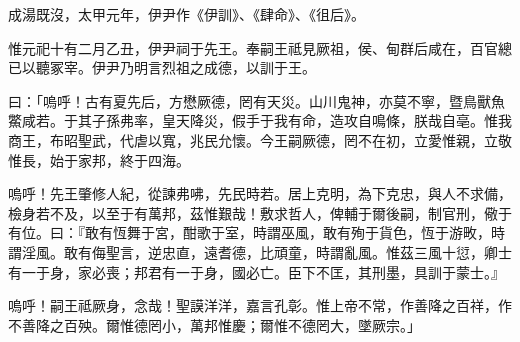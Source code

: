 
\begin{pinyinscope}
成湯既沒，太甲元年，伊尹作《伊訓》、《肆命》、《徂后》。

惟元祀十有二月乙丑，伊尹祠于先王。奉嗣王祗見厥祖，侯、甸群后咸在，百官總已以聽冢宰。伊尹乃明言烈祖之成德，以訓于王。

曰：「嗚呼！古有夏先后，方懋厥德，罔有天災。山川鬼神，亦莫不寧，暨鳥獸魚鱉咸若。于其子孫弗率，皇天降災，假手于我有命，造攻自鳴條，朕哉自亳。惟我商王，布昭聖武，代虐以寬，兆民允懷。今王嗣厥德，罔不在初，立愛惟親，立敬惟長，始于家邦，終于四海。

嗚呼！先王肇修人紀，從諫弗咈，先民時若。居上克明，為下克忠，與人不求備，檢身若不及，以至于有萬邦，茲惟艱哉！敷求哲人，俾輔于爾後嗣，制官刑，儆于有位。曰：『敢有恆舞于宮，酣歌于室，時謂巫風，敢有殉于貨色，恆于游畋，時謂淫風。敢有侮聖言，逆忠直，遠耆德，比頑童，時謂亂風。惟茲三風十愆，卿士有一于身，家必喪；邦君有一于身，國必亡。臣下不匡，其刑墨，具訓于蒙士。』

嗚呼！嗣王祗厥身，念哉！聖謨洋洋，嘉言孔彰。惟上帝不常，作善降之百祥，作不善降之百殃。爾惟德罔小，萬邦惟慶；爾惟不德罔大，墜厥宗。」


\end{pinyinscope}